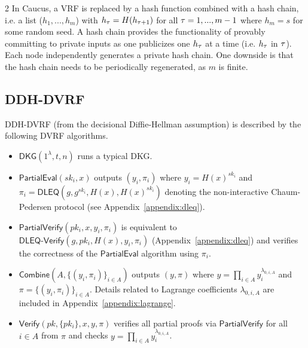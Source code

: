 \begin{table*}[h!]
\begin{threeparttable}
\begin{tablenotes}[flushleft]
\item[2] In Caucus, a VRF is replaced by a hash function combined with a hash chain, i.e. a list ($h_1, ..., h_m$) with $h_\tau = H(h_{\tau + 1})$ for all $\tau = 1, ..., m - 1$ where $h_m = s$ for some random seed. A hash chain provides the functionality of provably committing to private inputs as one publicizes one $h_\tau$ at a time (i.e. $h_\tau$ in \epoch $\tau$). Each node independently generates a private hash chain. One downside is that the hash chain needs to be periodically regenerated, as $m$ is finite.
\end{tablenotes}
\end{threeparttable}
\end{table*}

\subsection{DDH-DVRF}
\label{appendix:ddh-dvrf}
DDH-DVRF (from the decisional Diffie-Hellman assumption) is described by the following DVRF algorithms.
\begin{itemize}
\item $\mathsf{DKG}(1^\lambda, t, n)$ runs a typical DKG.
\item $\mathsf{PartialEval}(sk_i, x)$ outputs $(y_i, \pi_i)$ where $y_i = H(x)^{sk_i}$ and $\pi_i = \mathsf{DLEQ}(g, g^{sk_i}, H(x), H(x)^{sk_i})$ denoting the non-interactive Chaum-Pedersen protocol (see Appendix~\ref{appendix:dleq}).
\item $\mathsf{PartialVerify}(pk_i, x, y_i, \pi_i)$ is equivalent to $\mathsf{DLEQ}\text{-}\mathsf{Verify}(g, pk_i, H(x), y_i, \pi_i)$ (Appendix~\ref{appendix:dleq}) and verifies the correctness of the $\mathsf{PartialEval}$ algorithm using $\pi_i$.
\item $\mathsf{Combine}(A, \{(y_i, \pi_i)\}_{i \in A})$ outputs $(y, \pi)$ where $y = \prod_{i \in A} y_i^{\lambda_{0, i, A}}$ and $\pi = \{(y_i, \pi_i)\}_{i \in A}$. Details related to Lagrange coefficients $\lambda_{0, i, A}$ are included in Appendix~\ref{appendix:lagrange}.
\item $\mathsf{Verify}(pk, \{pk_i\}, x, y, \pi)$ verifies all partial proofs via $\mathsf{PartialVerify}$ for all $i \in A$ from $\pi$ and checks $y = \prod_{i \in A} y_i^{\lambda_{0, i, A}}$.
\end{itemize}

